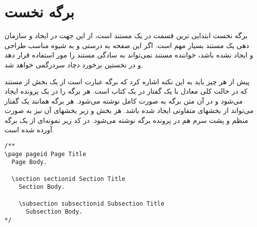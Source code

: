 %
% 
% 
% 
%
\section{برگه نخست}
  برگه نخست ابتدایی ترین قسمت در یک مستند است، از این جهت در ایجاد و سازمان دهی
  یک مستند بسیار مهم است.
  اگر این صفحه به درستی و به شیوه مناسب طراحی و ایجاد نشده باشد، خواننده مستند
  نمی‌تواند به سادگی مستند را مور استفاده قرار دهد و در نخستین برخورد دچاد
  سردرگمی خواهد شد.

  پیش از هر چیز باید به این نکته اشاره کرد که برگه عبارت است از یک بخش از مستند
  که در حالت کلی معادل با یک گفتار در یک کتاب است.
  هر برگه را در یک پرونده  ایجاد می‌شود و در آن متن برگه به صورت کامل
  نوشته می‌شود.
  هر برگه همانند یک گفتار می‌تواند از بخشهای متفاوتی ایجاد شده باشد.
  هر بخش و زیر بخشهای آن نیز به صورت منظم و پشت سرم هم در پرونده برگه نوشته
  می‌شود. در کد زیر نمونه‌ای از یک برگه آورده شده است.
  
\begin{latin}
\lstset{language=C++}
\begin{lstlisting}[frame=single] 
/**
\page pageid Page Title
  Page Body.
  
  \section sectionid Section Title
    Section Body.

    \subsection subsectionid Subsection Title
      Subsection Body.
*/
\end{lstlisting}
\end{latin}

